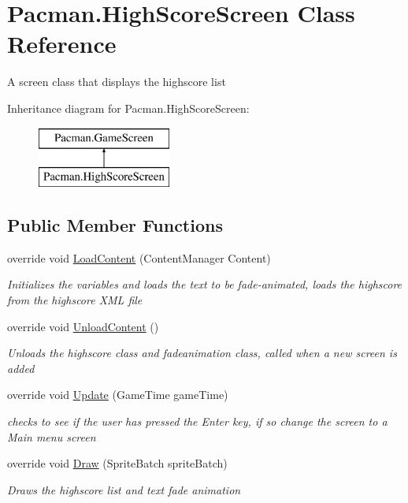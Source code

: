 \hypertarget{class_pacman_1_1_high_score_screen}{\section{Pacman.\-High\-Score\-Screen Class Reference}
\label{class_pacman_1_1_high_score_screen}
}


A screen class that displays the highscore list  


Inheritance diagram for Pacman.\-High\-Score\-Screen\-:\begin{figure}[H]
\begin{center}
\leavevmode
\includegraphics[height=2.000000cm]{class_pacman_1_1_high_score_screen}
\end{center}
\end{figure}
\subsection*{Public Member Functions}
\begin{DoxyCompactItemize}
\item 
override void \hyperlink{class_pacman_1_1_high_score_screen_a2f9c7bd488af9db87c5e74c5e4d21a4e}{Load\-Content} (Content\-Manager Content)
\begin{DoxyCompactList}\small\item\em Initializes the variables and loads the text to be fade-\/animated, loads the highscore from the highscore X\-M\-L file \end{DoxyCompactList}\item 
override void \hyperlink{class_pacman_1_1_high_score_screen_a9486bf7d1079734d5cf842b53c8f4ade}{Unload\-Content} ()
\begin{DoxyCompactList}\small\item\em Unloads the highscore class and fadeanimation class, called when a new screen is added \end{DoxyCompactList}\item 
override void \hyperlink{class_pacman_1_1_high_score_screen_a049329dc007241790cdf1603b0ef69d6}{Update} (Game\-Time game\-Time)
\begin{DoxyCompactList}\small\item\em checks to see if the user has pressed the Enter key, if so change the screen to a Main menu screen \end{DoxyCompactList}\item 
override void \hyperlink{class_pacman_1_1_high_score_screen_ad785f3290cea4ce2483d89dd651bee76}{Draw} (Sprite\-Batch sprite\-Batch)
\begin{DoxyCompactList}\small\item\em Draws the highscore list and text fade animation \end{DoxyCompactList}\end{DoxyCompactItemize}
